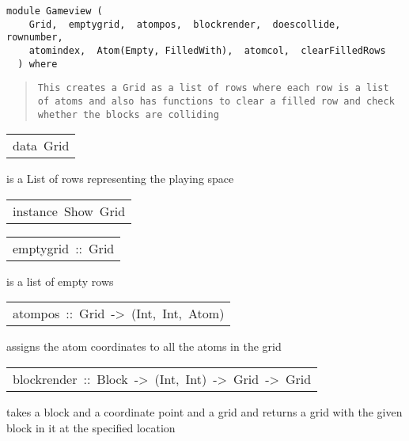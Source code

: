 \label{module:Gameview}
\haddockbeginheader
{\haddockverb\begin{verbatim}
module Gameview (
    Grid,  emptygrid,  atompos,  blockrender,  doescollide,  rownumber, 
    atomindex,  Atom(Empty, FilledWith),  atomcol,  clearFilledRows
  ) where\end{verbatim}}
\haddockendheader

\begin{quote}
{\haddockverb\begin{verbatim}
This creates a Grid as a list of rows where each row is a list of atoms and also has functions to clear a filled row and check 
whether the blocks are colliding\end{verbatim}}
\end{quote}

\begin{haddockdesc}
\item[\begin{tabular}{@{}l}
data\ Grid
\end{tabular}]\haddockbegindoc
{} is a List of rows representing the playing space \par

\end{haddockdesc}
\begin{haddockdesc}
\item[\begin{tabular}{@{}l}
instance\ Show\ Grid
\end{tabular}]
\end{haddockdesc}
\begin{haddockdesc}
\item[\begin{tabular}{@{}l}
emptygrid\ ::\ Grid
\end{tabular}]\haddockbegindoc
{} is a list of empty rows \par

\end{haddockdesc}
\begin{haddockdesc}
\item[\begin{tabular}{@{}l}
atompos\ ::\ Grid\ ->\ {\char 91}(Int,\ Int,\ Atom){\char 93}
\end{tabular}]\haddockbegindoc
{} assigns the atom coordinates to all the atoms in the grid\par

\end{haddockdesc}
\begin{haddockdesc}
\item[\begin{tabular}{@{}l}
blockrender\ ::\ Block\ ->\ (Int,\ Int)\ ->\ Grid\ ->\ Grid
\end{tabular}]\haddockbegindoc
{} takes a block and a coordinate point and a grid and returns a grid with the given block in it at the specified location \par

\end{haddockdesc}
